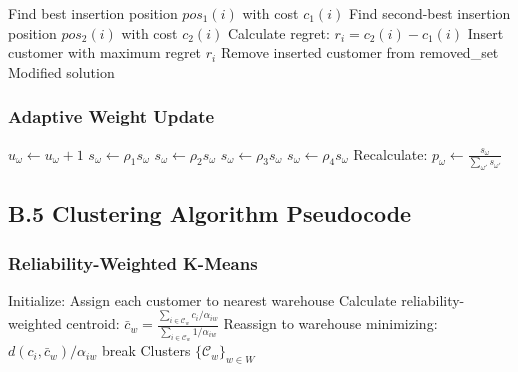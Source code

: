 \begin{algorithmic}[1]
\STATE Find best insertion position $pos_1(i)$ with cost $c_1(i)$
\STATE Find second-best insertion position $pos_2(i)$ with cost $c_2(i)$
\STATE Calculate regret: $r_i = c_2(i) - c_1(i)$
\ENDFOR
\STATE Insert customer with maximum regret $r_i$
\STATE Remove inserted customer from removed\_set
\ENDWHILE
\RETURN Modified solution
\ENDPROCEDURE
\end{algorithmic}

\subsubsection{Adaptive Weight Update}

\begin{algorithmic}[1]
\STATE $u_\omega \leftarrow u_\omega + 1$ 
\STATE $s_\omega \leftarrow \rho_1 s_\omega$ 
\STATE $s_\omega \leftarrow \rho_2 s_\omega$ 
\STATE $s_\omega \leftarrow \rho_3 s_\omega$ 
\ELSE
\STATE $s_\omega \leftarrow \rho_4 s_\omega$ 
\ENDIF
\STATE Recalculate: $p_\omega \leftarrow \frac{s_\omega}{\sum_{\omega'} s_{\omega'}}$
\ENDPROCEDURE
\end{algorithmic}

\subsection{B.5 Clustering Algorithm Pseudocode}

\subsubsection{Reliability-Weighted K-Means}

\begin{algorithmic}[1]
\STATE Initialize: Assign each customer to nearest warehouse
\STATE Calculate reliability-weighted centroid:
\STATE $\bar{c}_w = \frac{\sum_{i \in \mathcal{C}_w} c_i / \alpha_{iw}}{\sum_{i \in \mathcal{C}_w} 1/\alpha_{iw}}$
\ENDFOR
{}
\STATE Reassign to warehouse minimizing: $d(c_i, \bar{c}_w) / \alpha_{iw}$
\ENDFOR
{}
\STATE break
\ENDIF
\ENDFOR
\RETURN Clusters $\{\mathcal{C}_w\}_{w \in W}$
\ENDPROCEDURE
\end{algorithmic}


